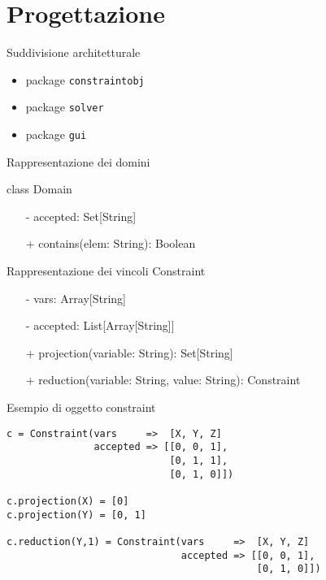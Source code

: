 \section{Progettazione}
\begin{frame}{Suddivisione architetturale}
\begin{itemize}
  \item package \texttt{constraintobj}
  \item package \texttt{solver}
  \item package \texttt{gui}
\end{itemize}
\end{frame}

\begin{frame}{Rappresentazione dei domini}


class Domain
\begin{itemize}
  \item[-] accepted: Set[String]
  \item[+] contains(elem: String): Boolean
\end{itemize}
\end{frame}

\begin{frame}{Rappresentazione dei vincoli}
Constraint
\begin{itemize}
  \item[-] vars: Array[String]
  \item[-] accepted: List[Array[String]]
  \item[+] projection(variable: String): Set[String]
  \item[+] reduction(variable: String, value: String): Constraint
\end{itemize}
\end{frame}

\begin{frame}[fragile]{Esempio di oggetto constraint}
\begin{verbatim}
c = Constraint(vars     =>  [X, Y, Z]
               accepted => [[0, 0, 1],
                            [0, 1, 1],
                            [0, 1, 0]])
                            
c.projection(X) = [0]
c.projection(Y) = [0, 1]

c.reduction(Y,1) = Constraint(vars     =>  [X, Y, Z]
                              accepted => [[0, 0, 1],
                                           [0, 1, 0]])
\end{verbatim}  
\end{frame}
